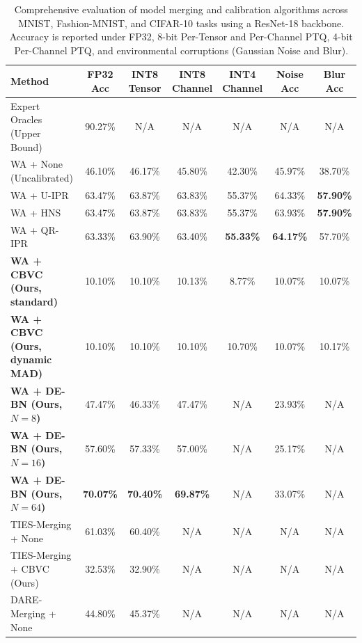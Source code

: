 \documentclass{article}
\begin{document}
\begin{table}[t]
\caption{Comprehensive evaluation of model merging and calibration algorithms across MNIST, Fashion-MNIST, and CIFAR-10 tasks using a ResNet-18 backbone. Accuracy is reported under FP32, 8-bit Per-Tensor and Per-Channel PTQ, 4-bit Per-Channel PTQ, and environmental corruptions (Gaussian Noise and Blur).}
\label{tab:results}
\vskip 0.15in
\begin{center}
\begin{small}
\begin{sc}
\setlength{\tabcolsep}{3.8pt}
\begin{tabular}{lcccccc}
\toprule
Method & FP32 Acc & INT8 Tensor & INT8 Channel & INT4 Channel & Noise Acc & Blur Acc \\
\midrule
Expert Oracles (Upper Bound) & 90.27\% & N/A & N/A & N/A & N/A & N/A \\
\midrule
WA + None (Uncalibrated) & 46.10\% & 46.17\% & 45.80\% & 42.30\% & 45.97\% & 38.70\% \\
WA + U-IPR & 63.47\% & 63.87\% & 63.83\% & 55.37\% & 64.33\% & \textbf{57.90\%} \\
WA + HNS & 63.47\% & 63.87\% & 63.83\% & 55.37\% & 63.93\% & \textbf{57.90\%} \\
WA + QR-IPR & 63.33\% & 63.90\% & 63.40\% & \textbf{55.33\%} & \textbf{64.17\%} & 57.70\% \\
\midrule
\textbf{WA + CBVC (Ours, standard)} & 10.10\% & 10.10\% & 10.13\% & 8.77\% & 10.07\% & 10.07\% \\
\textbf{WA + CBVC (Ours, dynamic MAD)} & 10.10\% & 10.10\% & 10.10\% & 10.70\% & 10.07\% & 10.17\% \\
\midrule
\textbf{WA + DE-BN (Ours, $N=8$)} & 47.47\% & 46.33\% & 47.47\% & N/A & 23.93\% & N/A \\
\textbf{WA + DE-BN (Ours, $N=16$)} & 57.60\% & 57.33\% & 57.00\% & N/A & 25.17\% & N/A \\
\textbf{WA + DE-BN (Ours, $N=64$)} & \textbf{70.07\%} & \textbf{70.40\%} & \textbf{69.87\%} & N/A & 33.07\% & N/A \\
\midrule
TIES-Merging + None & 61.03\% & 60.40\% & N/A & N/A & N/A & N/A \\
TIES-Merging + CBVC (Ours) & 32.53\% & 32.90\% & N/A & N/A & N/A & N/A \\
DARE-Merging + None & 44.80\% & 45.37\% & N/A & N/A & N/A & N/A \\
\bottomrule
\end{tabular}
\end{sc}
\end{small}
\end{center}
\vskip -0.1in
\end{table}
\end{document}
